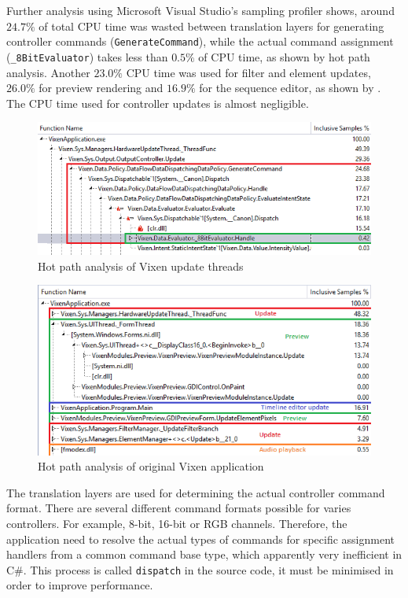 Further analysis using Microsoft Visual Studio's sampling profiler shows, around $24.7 \%$ of total CPU time was wasted between translation layers for generating controller commands (\texttt{GenerateCommand}), while the actual command assignment (\texttt{\_8BitEvaluator}) takes less than $0.5 \%$ of CPU time, as shown by  hot path analysis. Another $23.0 \%$ CPU time was used for filter and element updates, $26.0 \%$ for preview rendering and $16.9 \%$ for the sequence editor, as shown by . The CPU time used for controller updates is almost negligible.

\begin{figure}[t]
  \centering
  \includegraphics[width=0.85\columnwidth]{Figs/vixen_perf_original.png}
  \caption{Hot path analysis of Vixen update threads}
  \label{fig:vixen_perf_original}
\end{figure}

\begin{figure}[t]
  \centering
  \includegraphics[width=0.85\columnwidth]{Figs/vixen_perf_original_overview.png}
  \caption{Hot path analysis of original Vixen application}
  \label{fig:vixen_perf_original_overview}
\end{figure}

The translation layers are used for determining the actual controller command format. There are several different command formats possible for varies controllers. For example, 8-bit, 16-bit or RGB channels. Therefore, the application need to resolve the actual types of commands for specific assignment handlers from a common command base type, which apparently very inefficient in C\#. This process is called \texttt{dispatch} in the source code, it must be minimised in order to improve performance. 

